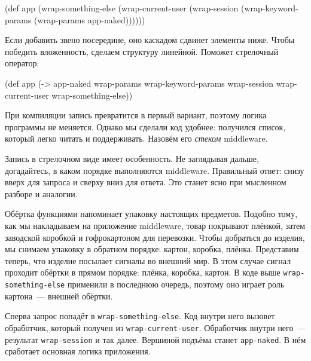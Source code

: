 \begin{english}
  \begin{clojure}
(def app
  (wrap-something-else
    (wrap-current-user
      (wrap-session
        (wrap-keyword-params
          (wrap-params app-naked))))))
  \end{clojure}
\end{english}


Если добавить звено посередине, оно каскадом сдвинет элементы ниже. Чтобы
победить вложенность, сделаем структуру линейной. Поможет стрелочный оператор:


\begin{english}
  \begin{clojure/lines}
(def app
  (-> app-naked
      wrap-params
      wrap-keyword-params
      wrap-session
      wrap-current-user
      wrap-something-else))
  \end{clojure/lines}
\end{english}


При компиляции запись превратится в первый вариант, поэтому логика программы не
меняется. Однако мы сделали код удобнее: получился список, который легко читать
и поддерживать. Назовём его \emph{стеком} middleware.

Запись в стрелочном виде имеет особенность. Не заглядывая дальше, догадайтесь, в
каком порядке выполняются middleware. Правильный ответ: снизу вверх для запроса
и сверху вниз для ответа. Это станет ясно при мысленном разборе и аналогии.


Обёртка функциями напоминает упаковку настоящих предметов. Подобно тому, как мы
накладываем на приложение middleware, товар покрывают плёнкой, затем заводской
коробкой и гофрокартоном для перевозки. Чтобы добраться до изделия, мы снимаем
упаковку в обратном порядке: картон, коробка, плёнка. Представим теперь, что
изделие посылает сигналы во внешний мир. В этом случае сигнал проходит обёртки в
прямом порядке: плёнка, коробка, картон. В коде выше \verb|wrap-something-else|
применили в последнюю очередь, поэтому оно играет роль картона~--- внешней
обёртки.

Сперва запрос попадёт в \texttt{wrap\--something\--else}. Код внутри него
вызовет обработчик, который получен из \verb|wrap-current-user|. Обработчик
внутри него~--- результат \verb|wrap-session| и так далее. Вершиной подъёма
станет \verb|app-naked|. В нём сработает основная логика приложения.

